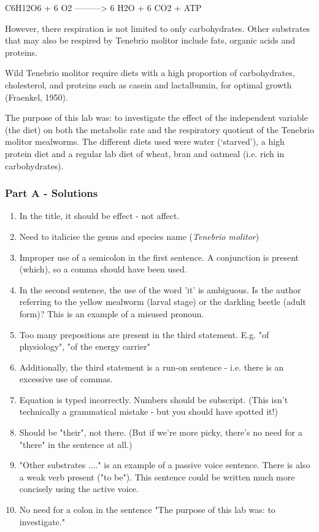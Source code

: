 \documentclass{article}
\begin{document}
C6H12O6 + 6 O2 ---------> 6 H2O + 6 CO2 + ATP 

However, there respiration is not limited to only carbohydrates. Other substrates that may also be respired by Tenebrio molitor include fats, organic acids and proteins. 

Wild Tenebrio molitor require diets with a high proportion of carbohydrates, cholesterol, and proteins such as casein and lactalbumin, for optimal growth (Fraenkel, 1950). 
 
The purpose of this lab was: to investigate the effect of the independent variable (the diet) on both the metabolic rate and the respiratory quotient of the Tenebrio molitor mealworms. The different diets used were water (‘starved’), a high protein diet and a regular lab diet of wheat, bran and oatmeal (i.e. rich in carbohydrates). 

\newpage
\subsubsection*{Part A - Solutions}

\begin{enumerate}
\item In the title, it should be effect - not affect.
\item Need to italicise the genus and species name (\textit{Tenebrio molitor})
\item Improper use of a semicolon in the first sentence. A conjunction is present (which), so a comma should have been used.
\item In the second sentence, the use of the word 'it' is ambiguous. Is the author referring to the yellow mealworm (larval stage) or the darkling beetle (adult form)? This is an example of a misused pronoun.
\item Too many prepositions are present in the third statement. E.g. "of physiology", "of the energy carrier"
\item Additionally, the third statement is a run-on sentence - i.e. there is an excessive use of commas.
\item Equation is typed incorrectly. Numbers should be subscript. (This isn't technically a grammatical mistake - but you should have spotted it!)
\item Should be "their", not there. (But if we're more picky, there's no need for a "there" in the sentence at all.)
\item "Other substrates ...." is an example of a passive voice sentence. There is also a weak verb present ("to be"). This sentence could be written much more concisely using the active voice.
\item No need for a colon in the sentence "The purpose of this lab was: to investigate."
\end{enumerate}
\end{document}
